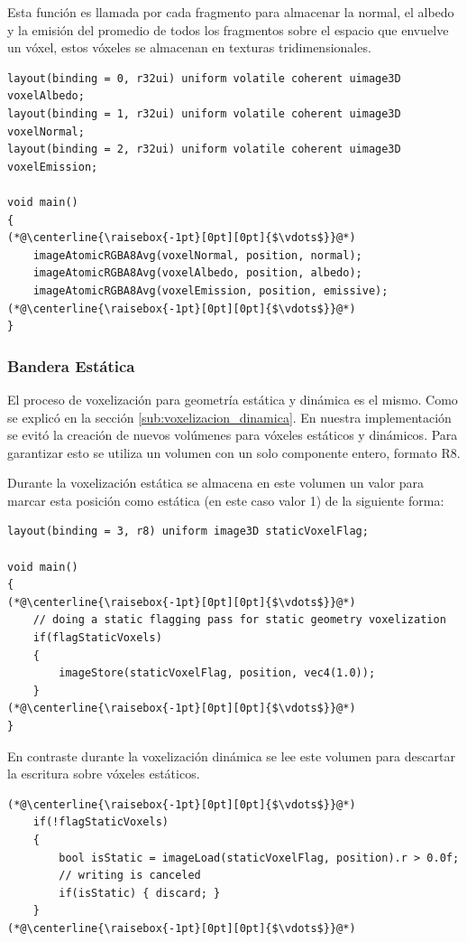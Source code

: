 Esta función es llamada por cada fragmento para almacenar la normal, el albedo y la emisión del promedio de todos los fragmentos sobre el espacio que envuelve un vóxel, estos vóxeles se almacenan en texturas tridimensionales.
\\
\begin{lstlisting}[caption={Composición de fragmentos y vóxeles}, label=Voxelization2]
layout(binding = 0, r32ui) uniform volatile coherent uimage3D voxelAlbedo;
layout(binding = 1, r32ui) uniform volatile coherent uimage3D voxelNormal;
layout(binding = 2, r32ui) uniform volatile coherent uimage3D voxelEmission;

void main()
{
(*@\centerline{\raisebox{-1pt}[0pt][0pt]{$\vdots$}}@*)
	imageAtomicRGBA8Avg(voxelNormal, position, normal);
	imageAtomicRGBA8Avg(voxelAlbedo, position, albedo);
	imageAtomicRGBA8Avg(voxelEmission, position, emissive);
(*@\centerline{\raisebox{-1pt}[0pt][0pt]{$\vdots$}}@*)
}
\end{lstlisting}

\subsubsection{Bandera Estática}
El proceso de voxelización para geometría estática y dinámica es el mismo. Como se explicó en la sección \ref{sub:voxelizacion_dinamica}. En nuestra implementación se evitó la creación de nuevos volúmenes para vóxeles estáticos y dinámicos. Para garantizar esto se utiliza un volumen con un solo componente entero, formato R8.

Durante la voxelización estática se almacena en este volumen un valor para marcar esta posición como estática (en este caso valor 1) de la siguiente forma:
\\
\begin{lstlisting}[caption={Escritura de la bandera estática durante voxelización de geometría estática}, label=Voxelization3]
layout(binding = 3, r8) uniform image3D staticVoxelFlag;

void main()
{
(*@\centerline{\raisebox{-1pt}[0pt][0pt]{$\vdots$}}@*)
    // doing a static flagging pass for static geometry voxelization
    if(flagStaticVoxels)
    {
        imageStore(staticVoxelFlag, position, vec4(1.0));
    }
(*@\centerline{\raisebox{-1pt}[0pt][0pt]{$\vdots$}}@*)
}
\end{lstlisting}
En contraste durante la voxelización dinámica se lee este volumen para descartar la escritura sobre vóxeles estáticos.
\\
\begin{lstlisting}[caption={Lectura de la bandera estática durante voxelización de geometría dinámica.}, label=Voxelization3]
(*@\centerline{\raisebox{-1pt}[0pt][0pt]{$\vdots$}}@*)
    if(!flagStaticVoxels)
    {
        bool isStatic = imageLoad(staticVoxelFlag, position).r > 0.0f;
        // writing is canceled
        if(isStatic) { discard; }
    }
(*@\centerline{\raisebox{-1pt}[0pt][0pt]{$\vdots$}}@*)
\end{lstlisting}

